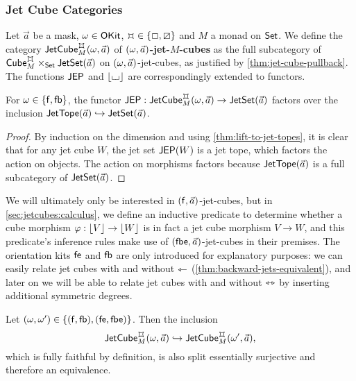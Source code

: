 \documentclass[a4paper]{memoir}
\begin{document}
\subsubsection{Jet Cube Categories}
\begin{definition} \label{def:jet-cube-cat}
	Let $\vec a$ be a mask, $\omega \in {\mathsf{OKit}}$, $\mycubex \in \accol{\affine, \cartes}$ and $M$ a monad on ${\mathsf{Set}}$.
	We define
	the category $\jetcube{\myorix}{\mycubex}{M}{\vec a}$ of \textbf{$(\omega, \vec a)$-jet-$M$-cubes}
	as the full subcategory of $\cubecat^\mycubex_M \times_\Set \jetset{\vec a}$ on $(\omega, \vec a)$-jet-cubes, as justified by \cref{thm:jet-cube-pullback}.
	The functions $\mathsf{JEP}$ and $\mathopen{}\left\lfloor {\llcorner\hspace{-.4ex}\lrcorner} \right\rfloor\mathclose{}$ are correspondingly extended to functors.
\end{definition}
\begin{corollary} \label{thm:jet-cubes-are-topes}
	For $\omega \in \mathopen{}\left\{ {\mathsf{f}}, {\mathsf{fb}} \right\}\mathclose{}$, the functor $\JEP : \jetcube{\myorix}{\mycubex}{M}{\vec a} \to \jetset{\vec a}$ factors over the inclusion $\mathsf{JetTope}(\vec a) \hookrightarrow \mathsf{JetSet}(\vec a)$.
\end{corollary}
\begin{proof}
	By induction on the dimension and using \cref{thm:lift-to-jet-topes}, it is clear that for any jet cube $W$, the jet set $\mathsf{JEP}(W)$ is a jet tope, which factors the action on objects. The action on morphisms factors because $\mathsf{JetTope}(\vec a)$ is a full subcategory of $\mathsf{JetSet}(\vec a)$.
\end{proof}
We will ultimately only be interested in $({\mathsf{f}}, \vec a)$-jet-cubes, but in \cref{sec:jetcubes:calculus}, we define an inductive predicate to determine whether a cube morphism $\varphi : \mathopen{}\left\lfloor V \right\rfloor\mathclose{} \to \mathopen{}\left\lfloor W \right\rfloor\mathclose{}$ is in fact a jet cube morphism $V \to W$, and this predicate's inference rules make use of $({\mathsf{fbe}}, \vec a)$-jet-cubes in their premises.
The orientation kits ${\mathsf{fe}}$ and ${\mathsf{fb}}$ are only introduced for explanatory purposes: we can easily relate jet cubes with and without $\leftarrowtriangle$ (\cref{thm:backward-jets-equivalent}), and later on we will be able to relate jet cubes with and without $\leftrightarrowtriangle$ by inserting additional symmetric degrees.
\begin{proposition} \label{thm:backward-jets-equivalent}
	Let $(\omega, \omega') \in \mathopen{}\left\{ ({\mathsf{f}}, {\mathsf{fb}}), ({\mathsf{fe}}, {\mathsf{fbe}}) \right\}\mathclose{}$.
	Then the inclusion
	\[
		\jetcube{\myorix}{\mycubex}{M}{\vec a} \hookrightarrow \jetcube{\myorix'}{\mycubex}{M}{\vec a},
	\]
	which is fully faithful by definition, is also split essentially surjective and therefore an equivalence.
\end{proposition}
\end{document}
